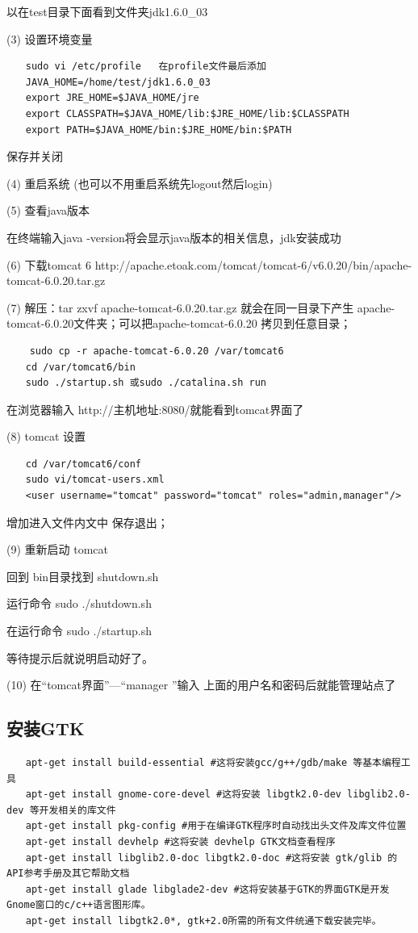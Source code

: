 以在test目录下面看到文件夹jdk1.6.0\_03

(3) 设置环境变量
\begin{verbatim}
　　sudo vi /etc/profile   在profile文件最后添加
　　JAVA_HOME=/home/test/jdk1.6.0_03
　　export JRE_HOME=$JAVA_HOME/jre
　　export CLASSPATH=$JAVA_HOME/lib:$JRE_HOME/lib:$CLASSPATH
　　export PATH=$JAVA_HOME/bin:$JRE_HOME/bin:$PATH
\end{verbatim}

保存并关闭

(4) 重启系统 (也可以不用重启系统先logout然后login)

(5) 查看java版本

在终端输入java -version将会显示java版本的相关信息，jdk安装成功

(6) 下载tomcat 6 http://apache.etoak.com/tomcat/tomcat-6/v6.0.20/bin/apache-tomcat-6.0.20.tar.gz

(7) 解压：tar zxvf apache-tomcat-6.0.20.tar.gz 就会在同一目录下产生 apache-tomcat-6.0.20文件夹；可以把apache-tomcat-6.0.20 拷贝到任意目录；

\begin{verbatim}
    sudo cp -r apache-tomcat-6.0.20 /var/tomcat6
　　cd /var/tomcat6/bin
　　sudo ./startup.sh 或sudo ./catalina.sh run
\end{verbatim}

在浏览器输入 http://主机地址:8080/就能看到tomcat界面了

(8) tomcat 设置
\begin{verbatim}
　　cd /var/tomcat6/conf
　　sudo vi/tomcat-users.xml
　　<user username="tomcat" password="tomcat" roles="admin,manager"/>
\end{verbatim}

增加进入文件内文中 保存退出；

(9) 重新启动 tomcat

回到 bin目录找到 shutdown.sh

运行命令 sudo ./shutdown.sh

在运行命令 sudo ./startup.sh

等待提示后就说明启动好了。

(10) 在“tomcat界面”---“manager ”输入 上面的用户名和密码后就能管理站点了

\subsection{安装GTK}
\begin{verbatim}
　　apt-get install build-essential #这将安装gcc/g++/gdb/make 等基本编程工具
　　apt-get install gnome-core-devel #这将安装 libgtk2.0-dev libglib2.0-dev 等开发相关的库文件
　　apt-get install pkg-config #用于在编译GTK程序时自动找出头文件及库文件位置
　　apt-get install devhelp #这将安装 devhelp GTK文档查看程序
　　apt-get install libglib2.0-doc libgtk2.0-doc #这将安装 gtk/glib 的API参考手册及其它帮助文档
　　apt-get install glade libglade2-dev #这将安装基于GTK的界面GTK是开发Gnome窗口的c/c++语言图形库。
　　apt-get install libgtk2.0*, gtk+2.0所需的所有文件统通下载安装完毕。
\end{verbatim}


